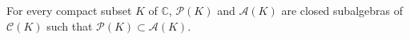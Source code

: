 For every compact subset $K$ of $\mathbb{C}$, $\mathcal{P}(K)$ and $\mathcal{A}(K)$ are closed subalgebras of $\mathcal{C}(K)$ such that $\mathcal{P}(K) \subset \mathcal{A}(K)$.
